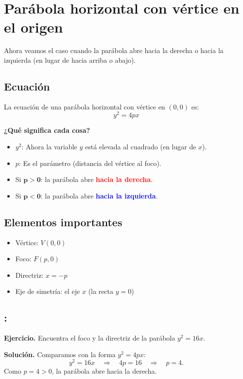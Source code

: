 \documentclass[12pt,a4paper]{article}
\begin{document}
	\section{Parábola horizontal con vértice en el origen}

	Ahora veamos el caso cuando la parábola abre hacia la derecha o hacia la izquierda (en lugar de hacia arriba o abajo).

	\subsection*{Ecuación}

	La ecuación de una parábola horizontal con vértice en \((0,0)\) es:
	\[
	\boxed{y^2=4px}
	\]

	\textbf{¿Qué significa cada cosa?}
	\begin{itemize}
		\item \(y^2\): Ahora la variable \(y\) está elevada al cuadrado (en lugar de \(x\)).
		\item \(p\): Es el parámetro (distancia del vértice al foco).
		\item Si \(\mathbf{p>0}\): la parábola abre \textcolor{red}{\textbf{hacia la derecha}}.
		\item Si \(\mathbf{p<0}\): la parábola abre \textcolor{blue}{\textbf{hacia la izquierda}}.
	\end{itemize}

	\subsection*{Elementos importantes}
	\begin{itemize}
		\item Vértice: \(V(0,0)\)
		\item Foco: \(F(p,0)\)
		\item Directriz: \(x=-p\)
		\item Eje de simetría: el eje \(x\) (la recta \(y=0\))
	\end{itemize}

	\subsection*{{\color{blue!40!red}{Ejemplo 3}}: \color{blue!80!black}{Parábola que abre hacia la derecha}}

	\textbf{Ejercicio.} Encuentra el foco y la directriz de la parábola \(y^2=16x\).

	\bigskip

	\textbf{Solución.} Comparamos con la forma \(y^2=4px\):
	\[
	y^2=16x \quad\Rightarrow\quad 4p=16 \quad\Rightarrow\quad p=4.
	\]
	Como \(p=4>0\), la parábola abre hacia la derecha.
\end{document}
